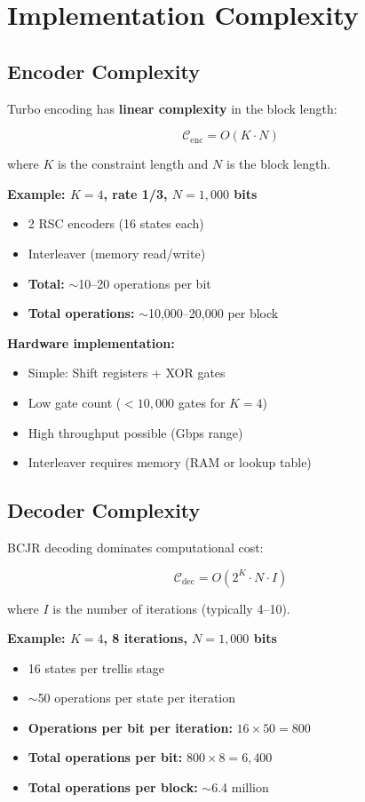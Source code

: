 \section{Implementation Complexity}

\subsection{Encoder Complexity}

Turbo encoding has \textbf{linear complexity} in the block length:

\begin{equation}
\mathcal{C}_{\text{enc}} = O(K \cdot N)
\end{equation}

where $K$ is the constraint length and $N$ is the block length.

\textbf{Example: $K=4$, rate 1/3, $N=1{,}000$ bits}
\begin{itemize}
\item 2 RSC encoders (16 states each)
\item Interleaver (memory read/write)
\item \textbf{Total:} $\sim$10--20 operations per bit
\item \textbf{Total operations:} $\sim$10,000--20,000 per block
\end{itemize}

\textbf{Hardware implementation:}
\begin{itemize}
\item Simple: Shift registers + XOR gates
\item Low gate count ($< 10{,}000$ gates for $K=4$)
\item High throughput possible (Gbps range)
\item Interleaver requires memory (RAM or lookup table)
\end{itemize}

\subsection{Decoder Complexity}

BCJR decoding dominates computational cost:

\begin{equation}
\mathcal{C}_{\text{dec}} = O(2^K \cdot N \cdot I)
\end{equation}

where $I$ is the number of iterations (typically 4--10).

\textbf{Example: $K=4$, 8 iterations, $N=1{,}000$ bits}
\begin{itemize}
\item 16 states per trellis stage
\item $\sim$50 operations per state per iteration
\item \textbf{Operations per bit per iteration:} $16 \times 50 = 800$
\item \textbf{Total operations per bit:} $800 \times 8 = 6{,}400$
\item \textbf{Total operations per block:} $\sim$6.4 million
\end{itemize}

